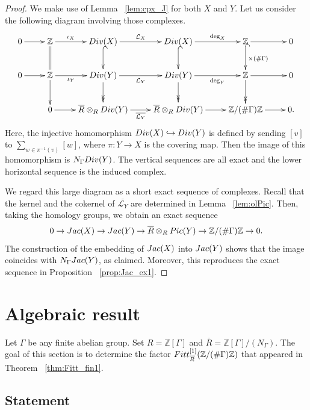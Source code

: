 \documentclass[11pt]{article}
\theoremstyle{definition}
\numberwithin{equation}{section}
\newcommand{\Z}{\mathbb{Z}}
\newcommand{\cL}{\mathcal{L}}
\newcommand{\ol}[1]{\overline{#1}}
\newcommand{\Div}{{\rm Div}}
\newcommand{\Pic}{{\rm Pic}}
\newcommand{\Jac}{{\rm Jac}}
\newcommand{\Fitt}{{\rm Fitt}}
\begin{document}
\begin{proof}
We make use of Lemma ~\ref{lem:cpx_J} for both $X$ and $Y$.
Let us consider the following diagram involving those complexes.
\[
\xymatrix{
	0 \ar[r]
	& \Z \ar[r]^-{\iota_X} \ar@{=}[d]
	& \Div(X) \ar[r]^{\cL_X} \ar@{^(->}[d]
	& \Div(X) \ar[r]^-{\deg_X} \ar@{^(->}[d]
	& \Z \ar[r] \ar@{^(->}[d]^{\times (\# \Gamma)}
	& 0\\
	0 \ar[r]
	& \Z \ar[r]_-{\iota_Y} \ar[d]
	& \Div(Y) \ar[r]_{\cL_{Y}} \ar@{->>}[d]
	& \Div(Y) \ar[r]_-{\deg_{Y}} \ar@{->>}[d]
	& \Z \ar[r] \ar@{->>}[d]
	& 0\\
	& 0 \ar[r] 
	& \ol{R} \otimes_{R} \Div(Y) \ar[r]_{\ol{\cL_{Y}}}
	& \ol{R} \otimes_{R} \Div(Y) \ar[r]
	& \Z/(\# \Gamma) \Z \ar[r] 
	& 0.
}
\]
Here, the injective homomorphism $\Div(X) \hookrightarrow \Div(Y)$ is defined by sending $[v]$ to $\sum_{w \in \pi^{-1}(v)} [w]$, where $\pi: Y \to X$ is the covering map.
Then the image of this homomorphism is $N_{\Gamma} \Div(Y)$.
The vertical sequences are all exact and the lower horizontal sequence is the induced complex.

We regard this large diagram as a short exact sequence of complexes.
Recall that the kernel and the cokernel of $\ol{\cL_Y}$ are determined in Lemma ~\ref{lem:olPic}.
Then, taking the homology groups, we obtain an exact sequence
\begin{equation}\label{eq:31-1}
0 \to \Jac(X) \to \Jac(Y) \to \ol{R} \otimes_R \Pic(Y)  \to \Z/(\# \Gamma) \Z \to 0.
\end{equation}
The construction of the embedding of $\Jac(X)$ into $\Jac(Y)$ shows that the image coincides with $N_{\Gamma} \Jac(Y)$, as claimed.
Moreover, this reproduces the exact sequence in Proposition ~\ref{prop:Jac_ex1}.
\end{proof}

\section{Algebraic result}\label{sec:fin_alg}

Let $\Gamma$ be any finite abelian group.
Set $R = \Z[\Gamma]$ and $\ol{R} = \Z[\Gamma]/(N_{\Gamma})$.
The goal of this section is to determine the factor $\Fitt^{[1]}_{\ol{R}}(\Z/ (\#\Gamma) \Z)$ that appeared in Theorem ~\ref{thm:Fitt_fin1}.

\subsection{Statement}\label{ss:fin_alg}
\end{document}
